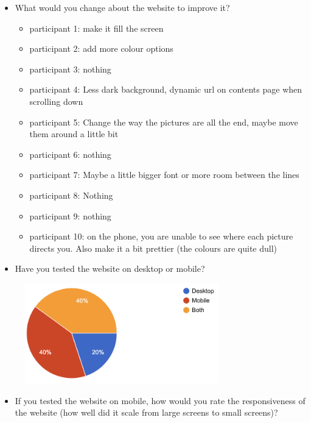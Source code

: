 \documentclass[letterpaper,12pt]{article}
\begin{document}
\begin{appendices}
\begin{itemize}
    \item What would you change about the website to improve it?
    \begin{itemize}
        \item 	participant 1: 	make it fill the screen
        \item 	participant 2: 	add more colour options
        \item 	participant 3: 	nothing
        \item 	participant 4: 	Less dark background, dynamic url on contents page when scrolling down
        \item 	participant 5: 	Change the way the pictures are all the end, maybe move them around a little bit 
        \item 	participant 6: 	nothing
        \item 	participant 7: 	Maybe a little bigger font or more room between the lines
        \item 	participant 8: 	Nothing
        \item 	participant 9: 	nothing
        \item 	participant 10: 	on the phone, you are unable to see where each picture directs you. Also make it a bit prettier (the colours are quite dull)
    \end{itemize}
\end{itemize}

\begin{itemize}
    \item Have you tested the website on desktop or mobile?
\end{itemize}

\begin{figure}[h] 
\centerline{\includegraphics[width=0.75\textwidth]{report/images/user-survey-device.png}}
{\label{fig:user-survey-device}}
\end{figure}

\begin{itemize}
    \item If you tested the website on mobile, how would you rate the responsiveness of the website (how well did it scale from large screens to small screens)?
\end{itemize}


\end{appendices}
\end{document}
